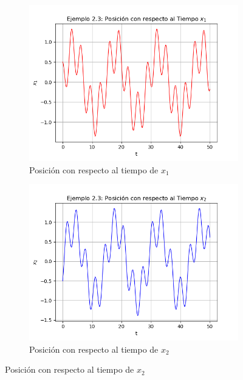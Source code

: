 \documentclass[a4paper]{article}
\begin{document}
\begin{figure}[ht!]
\begin{subfigure}{0.6\textwidth}
  \includegraphics[width=\linewidth]{ejemplo_2_3_2.png}
  \caption{Posición con respecto al tiempo de $x_1$}
\end{subfigure}
\begin{subfigure}{0.6\textwidth}
  \centering
  \includegraphics[width=\linewidth]{ejemplo_2_3_3.png}
  \caption{Posición con respecto al tiempo de $x_2$}
\end{subfigure}
\end{figure}
\end{document}
